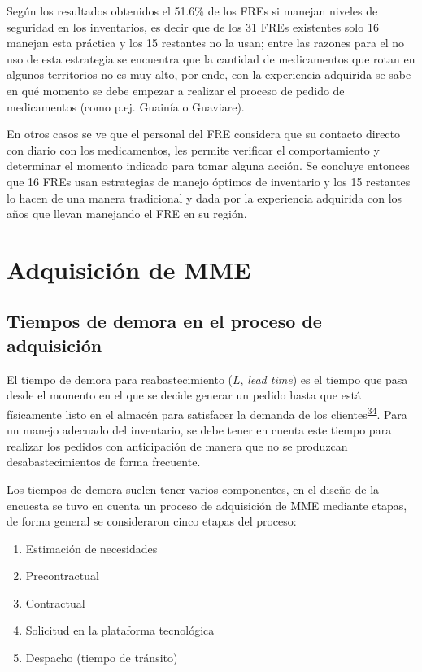 \documentclass[
  oneside]{book}
\begin{document}
Según los resultados obtenidos el 51.6\% de los FREs si manejan niveles de seguridad en los inventarios, es decir que de los 31 FREs existentes solo 16 manejan esta práctica y los 15 restantes no la usan; entre las razones para el no uso de esta estrategia se encuentra que la cantidad de medicamentos que rotan en algunos territorios no es muy alto, por ende, con la experiencia adquirida se sabe en qué momento se debe empezar a realizar el proceso de pedido de medicamentos (como p.ej. Guainía o Guaviare).

En otros casos se ve que el personal del FRE considera que su contacto directo con diario con los medicamentos, les permite verificar el comportamiento y determinar el momento indicado para tomar alguna acción. Se concluye entonces que 16 FREs usan estrategias de manejo óptimos de inventario y los 15 restantes lo hacen de una manera tradicional y dada por la experiencia adquirida con los años que llevan manejando el FRE en su región.

\hypertarget{adquisiciuxf3n-de-mme}{%
\section{Adquisición de MME}\label{adquisiciuxf3n-de-mme}}

\hypertarget{tiempos-de-demora-en-el-proceso-de-adquisiciuxf3n}{%
\subsection{Tiempos de demora en el proceso de adquisición}\label{tiempos-de-demora-en-el-proceso-de-adquisiciuxf3n}}

El tiempo de demora para reabastecimiento (\(L\), \emph{lead time}) es el tiempo que pasa desde el momento en el que se decide generar un pedido hasta que está físicamente listo en el almacén para satisfacer la demanda de los clientes\textsuperscript{\protect\hyperlink{ref-Silver2017}{34}}. Para un manejo adecuado del inventario, se debe tener en cuenta este tiempo para realizar los pedidos con anticipación de manera que no se produzcan desabastecimientos de forma frecuente.

Los tiempos de demora suelen tener varios componentes, en el diseño de la encuesta se tuvo en cuenta un proceso de adquisición de MME mediante etapas, de forma general se consideraron cinco etapas del proceso:

\begin{enumerate}
\def\labelenumi{\arabic{enumi}.}
\item
  Estimación de necesidades
\item
  Precontractual
\item
  Contractual
\item
  Solicitud en la plataforma tecnológica
\item
  Despacho (tiempo de tránsito)
\end{enumerate}
\end{document}
